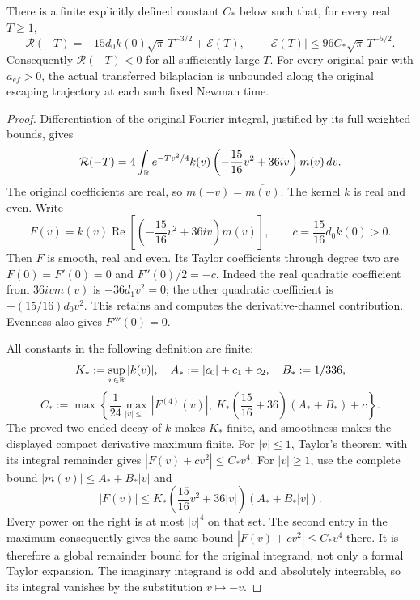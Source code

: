 \begin{proposition}
There is a finite explicitly defined constant $C_*$ below such that,
for every real $T\geq1$,
\begin{equation}
 \mathcal R(-T)=-15d_0k(0)\sqrt\pi\,T^{-3/2}+\mathcal E(T),
 \qquad |\mathcal E(T)|\leq96C_*\sqrt\pi\,T^{-5/2}.
 \label{x4b:asymptotic}
\end{equation}
Consequently $\mathcal R(-T)<0$ for all sufficiently large $T$.
For every original pair with $a_{ef}>0$, the actual transferred
bilaplacian is unbounded along the original escaping trajectory
at each such fixed Newman time.
\end{proposition}
\begin{proof}
Differentiation of the original Fourier integral, justified by its
full weighted bounds, gives
\[
 \mathcal R(-T)=4\int_{\mathbb R}e^{-Tv^2/4}k(v)
       \left(-\frac{15}{16}v^2+36iv\right)m(v)\,dv.
\]
The original coefficients are real, so $m(-v)=\overline{m(v)}$.
The kernel $k$ is real and even. Write
\[
 F(v)=k(v)\operatorname{Re}\left[
           \left(-\frac{15}{16}v^2+36iv\right)m(v)\right],
 \qquad c=\frac{15}{16}d_0k(0)>0.
\]
Then $F$ is smooth, real and even. Its Taylor coefficients through
degree two are $F(0)=F'(0)=0$ and $F''(0)/2=-c$.
Indeed the real quadratic coefficient from $36ivm(v)$ is
$-36d_1v^2=0$; the other quadratic coefficient is
$-(15/16)d_0v^2$. This retains and computes the derivative-channel
contribution. Evenness also gives $F'''(0)=0$.

All constants in the following definition are finite:
\[
 K_*:=\sup_{v\in\mathbb R}|k(v)|,\quad
 A_*:=|c_0|+c_1+c_2,\quad B_*:=1/336,
\]
\[
 C_*:=\max\left\{
 \frac1{24}\max_{|v|\leq1}|F^{(4)}(v)|,
 \ K_*\left(\frac{15}{16}+36\right)(A_*+B_*)+c
                    \right\}.
\]
The proved two-ended decay of $k$ makes $K_*$ finite, and smoothness
makes the displayed compact derivative maximum finite. For $|v|\leq1$,
Taylor's theorem with its integral remainder gives
$|F(v)+cv^2|\leq C_*v^4$. For $|v|\geq1$, use the complete bound
$|m(v)|\leq A_*+B_*|v|$ and
\[
 |F(v)|\leq K_*\left(\frac{15}{16}v^2+36|v|\right)
                         (A_*+B_*|v|).
\]
Every power on the right is at most $|v|^4$ on that set. The second
entry in the maximum consequently gives the same bound
$|F(v)+cv^2|\leq C_*v^4$ there. It is therefore a global remainder
bound for the original integrand, not only a formal Taylor expansion.
The imaginary integrand is odd and absolutely integrable, so its
integral vanishes by the substitution $v\mapsto-v$.


\end{proof}
